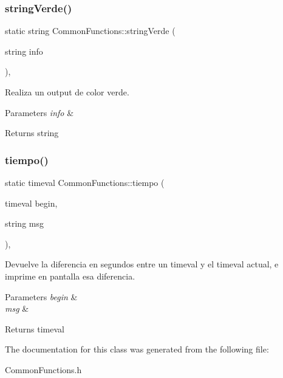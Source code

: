 \subsubsection{\texorpdfstring{string\+Verde()}{stringVerde()}}
{\footnotesize\ttfamily static string Common\+Functions\+::string\+Verde (\begin{DoxyParamCaption}\item[{string}]{info }\end{DoxyParamCaption})\hspace{0.3cm}{\ttfamily [inline]}, {\ttfamily [static]}}



Realiza un output de color verde. 


\begin{DoxyParams}{Parameters}
{\em info} & \\
\hline
\end{DoxyParams}
\begin{DoxyReturn}{Returns}
string 
\end{DoxyReturn}
\mbox{\label{classCommonFunctions_a72ec70e251bf9b34409318b71e55d34e}} 
\subsubsection{\texorpdfstring{tiempo()}{tiempo()}}
{\footnotesize\ttfamily static timeval Common\+Functions\+::tiempo (\begin{DoxyParamCaption}\item[{timeval}]{begin,  }\item[{string}]{msg }\end{DoxyParamCaption})\hspace{0.3cm}{\ttfamily [inline]}, {\ttfamily [static]}}



Devuelve la diferencia en segundos entre un timeval y el timeval actual, e imprime en pantalla esa diferencia. 


\begin{DoxyParams}{Parameters}
{\em begin} & \\
\hline
{\em msg} & \\
\hline
\end{DoxyParams}
\begin{DoxyReturn}{Returns}
timeval 
\end{DoxyReturn}


The documentation for this class was generated from the following file\+:\begin{DoxyCompactItemize}
\item 
Common\+Functions.\+h\end{DoxyCompactItemize}

